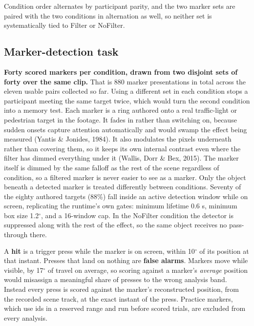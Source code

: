 Condition order alternates by participant parity, and the two marker sets are paired with the two
conditions in alternation as well, so neither set is systematically tied to Filter or NoFilter.

\subsection{Marker-detection task}

\textbf{Forty scored markers per condition, drawn from two disjoint sets of forty over the same
clip.} That is 880 marker presentations in total across the eleven usable pairs collected so far.
Using a different set in each condition stops a participant meeting the same target twice, which
would turn the second condition into a memory test. Each marker is a ring authored onto a real
traffic-light or pedestrian target in the footage. It fades in rather than switching on, because sudden onsets capture
attention automatically and would swamp the effect being measured (Yantis \& Jonides, 1984). It also
modulates the pixels underneath rather than covering them, so it keeps its own internal contrast even
where the filter has dimmed everything under it (Wallis, Dorr \& Bex, 2015). The marker itself is
dimmed by the same falloff as the rest of the scene regardless of condition, so a filtered marker is
never easier to see as a marker. Only the object beneath a detected marker is treated differently
between conditions. Seventy of the eighty authored targets (88\%) fall inside an active detection
window while on screen, replicating the runtime's own gates: minimum lifetime 0.6 s, minimum box size
1.2$^{\circ}$, and a 16-window cap. In the NoFilter condition the detector is suppressed along with the
rest of the effect, so the same object receives no pass-through there.

A \textbf{hit} is a trigger press while the marker is on screen, within 10$^{\circ}$ of its position at
that instant. Presses that land on nothing are \textbf{false alarms}. Markers move while visible, by
17$^{\circ}$ of travel on average, so scoring against a marker's \textit{average} position would
misassign a meaningful share of presses to the wrong analysis band. Instead every press is scored
against the marker's reconstructed position, from the recorded scene track, at the exact instant of
the press. Practice markers, which use ids in a reserved range and run before scored trials, are
excluded from every analysis.

